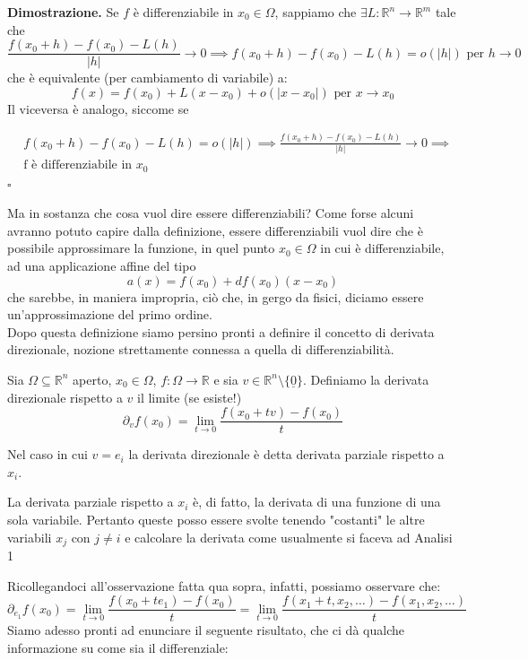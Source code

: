 \noindent \textbf{Dimostrazione. }
Se $f$ è differenziabile in $x_0 \in \Omega$, sappiamo che $\exists L : \mathbb{R}^n \to \mathbb{R}^m$ tale che
$$
\frac{f(x_0 + h) - f(x_0) - L(h)}{|h|} \to 0 \implies f(x_0 + h) - f(x_0) - L(h) = o(|h|) \text{ per } h \to 0
$$
che è equivalente (per cambiamento di variabile) a:
$$
f(x) = f(x_0) + L(x-x_0) + o(|x-x_0|) \text{ per } x \to x_0
$$
Il viceversa è analogo, siccome se

\[\begin{aligned}
&f(x_0 + h) - f(x_0) - L(h) = o(|h|) \implies \frac{f(x_0 + h) - f(x_0) - L(h)}{|h|} \to 0 \implies \\
&\text{f è differenziabile in } x_0
\end{aligned}\]
\hfill $\square$

\noindent Ma in sostanza che cosa vuol dire essere differenziabili? Come forse alcuni avranno potuto capire dalla definizione, essere differenziabili vuol dire che è possibile approssimare la funzione, in quel punto $x_0 \in \Omega$ in cui è differenziabile, ad una applicazione affine del tipo $$a(x) = f(x_0) + df(x_0)(x-x_0)$$ che sarebbe, in maniera impropria, ciò che, in gergo da fisici, diciamo essere un'approssimazione del primo ordine. \\
Dopo questa definizione siamo persino pronti a definire il concetto di derivata direzionale, nozione strettamente connessa a quella di differenziabilità.

%
\vspace{0.5cm}
\begin{definition}[\textcolor{blue}{derivata direzionale}]
Sia $\Omega \subseteq \mathbb{R}^n$ aperto, $x_0 \in \Omega$, $f: \Omega \to \mathbb{R}$ e sia $v \in \mathbb{R}^n \setminus \{ \underline{0} \}$. Definiamo la derivata direzionale rispetto a $v$ il limite (se esiste!)
$$
\partial_v f(x_0) = \lim_{t \to 0} \frac{f(x_0 + tv) - f(x_0)}{t}
$$
\end{definition}

\noindent Nel caso in cui $v = e_i$ la derivata direzionale è detta derivata parziale rispetto a $x_i$.

\begin{remark}
La derivata parziale rispetto a $x_i$ è, di fatto, la derivata di una funzione di una sola variabile. Pertanto queste posso essere svolte tenendo "costanti" le altre variabili $x_j$ con $j \neq i$ e calcolare la derivata come usualmente si faceva ad Analisi 1
\end{remark}

\noindent Ricollegandoci all'osservazione fatta qua sopra, infatti, possiamo osservare che:
$$
\partial_{e_1} f(x_0) = \lim_{t \to 0} \frac{f(x_0 + te_1) - f(x_0)}{t} = \lim_{t \to 0} \frac{f(x_1 + t, x_2, \ldots) - f(x_1, x_2, \ldots )}{t}
$$
Siamo adesso pronti ad enunciare il seguente risultato, che ci dà qualche informazione su come sia il differenziale:

